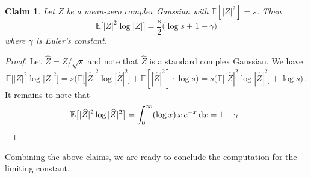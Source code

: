 \documentclass[11pt]{amsart}
\newtheorem{claim}[theorem]{Claim}
\theoremstyle{remark}
\theoremstyle{definition}
\newcommand{\bE}{\mathbb E}
\begin{document}
    \begin{claim}
    \label{claim:compute_numerator_in_kac_rice_density}
        Let $Z$ be a mean-zero complex Gaussian with $\bE[|Z|^2] = s$. Then
        \[
        \bE\big[|Z|^2 \log|Z|\big] = \frac{s}{2}\big(\log s + 1-\gamma\big)
        \]
        where $\gamma$ is Euler's constant. 
    \end{claim}
    \begin{proof}
        Let $\widehat Z = Z/\sqrt{s}$ and note that $\widehat{Z}$ is a standard complex Gaussian. We have
        \[
        \bE\big[|Z|^2 \log|Z|^2\big] = s\Big( \bE\big[|\widehat Z|^2 \log|\widehat Z|^2\big] + \bE[|\widehat Z|^2] \cdot \log s \Big) = s\Big( \bE\big[|\widehat Z|^2 \log|\widehat Z|^2\big] +  \log s \Big)  \, .
        \]
        It remains to note that 
        \[
        \bE\big[|\widehat Z|^2 \log|\widehat Z|^2\big] = \int_{0}^\infty (\log x) \, x \, e^{-x} \, {\rm d}x = 1-\gamma\, . \qedhere
        \]
    \end{proof}
    \noindent
    Combining the above claims, we are ready to conclude the computation for the limiting constant. 
\end{document}
